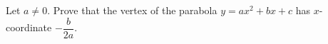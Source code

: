 Let $a\ne0$. Prove that the vertex of the parabola $y=ax^2+bx+c$ has $x$-coordinate $-\dfrac{b}{2a}$.
